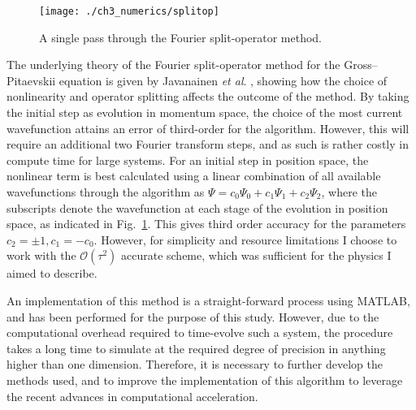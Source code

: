 \begin{figure}
    \centering
    \texttt{[image: ./ch3\_numerics/splitop]}
    \caption{A single pass through the Fourier split-operator method.}
    \label{fig:num_splitop}
\end{figure}

The underlying theory of the Fourier split-operator method for the Gross--Pitaevskii equation is given by Javanainen \textit{et al}. \cite{BEC:Javanainen_jphysa_2006}, showing how the choice of nonlinearity and operator splitting affects the outcome of the method. By taking the initial step as evolution in momentum space, the choice of the most current wavefunction attains an error of third-order for the algorithm. However, this will require an additional two Fourier transform steps, and as such is rather costly in compute time for large systems. For an initial step in position space, the nonlinear term is best calculated using a linear combination of all available wavefunctions through the algorithm as $\Psi = c_0\Psi_0 + c_1\Psi_1 + c_2\Psi_2$, where the subscripts denote the wavefunction at each stage of the evolution in position space, as indicated in Fig.~\ref{fig:num_splitop}. This gives third order accuracy for the parameters $c_2=\pm 1, c_1=-c_0$. However, for simplicity and resource limitations I choose to work with the $\mathcal{O}\left(\tau^2\right)$ accurate scheme, which was sufficient for the physics I aimed to describe.

An implementation of this method is a straight-forward process using MATLAB, and has been performed for the purpose of this study. However, due to the computational overhead required to time-evolve such a system, the procedure takes a long time to simulate at the required degree of precision in anything higher than one dimension. Therefore, it is necessary to further develop the methods used, and to improve the implementation of this algorithm to leverage the recent advances in computational acceleration.

